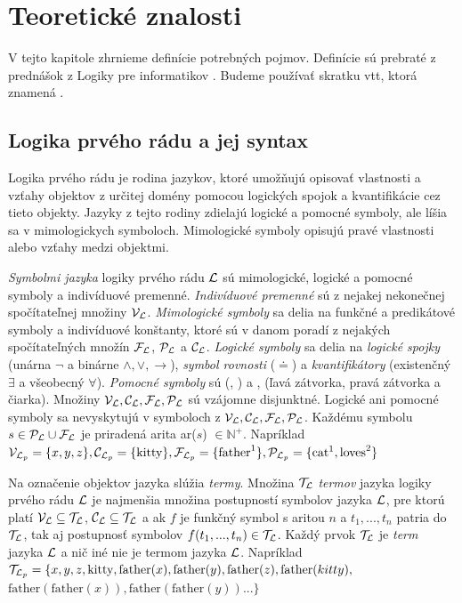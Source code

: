 \chapter{Teoretické znalosti}

V tejto kapitole zhrnieme definície potrebných pojmov. Definície sú prebraté z prednášok z Logiky pre informatikov \cite{logicdefs}. Budeme používať skratku vtt, ktorá znamená .


\section{Logika prvého rádu a jej syntax}

Logika prvého rádu je rodina jazykov, ktoré umožňujú opisovať vlastnosti a vzťahy objektov z určitej domény pomocou logických spojok a kvantifikácie cez tieto objekty. Jazyky z tejto rodiny zdielajú logické a pomocné symboly, ale líšia sa v mimologickych symboloch. Mimologické symboly opisujú pravé vlastnosti alebo vzťahy medzi objektmi.

\emph{Symbolmi jazyka} logiky prvého rádu $\mathcal{L}$ sú mimologické, logické a pomocné symboly a indivíduové premenné.
\emph{Indivíduové premenné} sú z nejakej nekonečnej spočítateľnej množiny $\mathcal{V}_{\mathcal{L}}$.
\emph{Mimologické symboly} sa delia na funkčné a predikátové symboly a indivíduové konštanty, ktoré sú v danom poradí z nejakých spočítateľných množín $\mathcal{F}_{\mathcal{L}}$, $\mathcal{P}_{\mathcal{L}}$ a $\mathcal{C}_{\mathcal{L}}$.
\emph{Logické symboly} sa delia na \emph{logické spojky} (unárna $\neg$ a binárne $\land, \lor, \to$), \emph{symbol rovnosti} ($\doteq$) a \emph{kvantifikátory} (existenčný $\exists$ a všeobecný $\forall$).
\emph{Pomocné symboly} sú (, ) a , (ľavá zátvorka, pravá zátvorka a čiarka).
Množiny $\mathcal{V}_{\mathcal{L}},\mathcal{C}_{\mathcal{L}}, \mathcal{F}_{\mathcal{L}}, \mathcal{P}_{\mathcal{L}}$ sú vzájomne disjunktné. Logické ani pomocné symboly sa nevyskytujú v symboloch z $\mathcal{V}_{\mathcal{L}}, \mathcal{C}_{\mathcal{L}}, \mathcal{F}_{\mathcal{L}}, \mathcal{P}_{\mathcal{L}}$. Každému symbolu $s \in \mathcal{P}_{\mathcal{L}} \cup \mathcal{F}_{\mathcal{L}}$ je priradená arita ar($s$) $\in \mathbb{N}^+$.
Napríklad $\mathcal{V}_{\mathcal{L}_p} = \{x, y, z\}, \mathcal{C}_{\mathcal{L}_p} = \{\text{kitty}\}, \mathcal{F}_{\mathcal{L}_p} = \{\text{father}^1\}, \mathcal{P}_{\mathcal{L}_p} = \{\text{cat}^1, \text{loves}^2\}$

Na označenie objektov jazyka slúžia \emph{termy}. 
Množina $\mathcal{T}_{\mathcal{L}}$ \emph{termov} jazyka logiky prvého rádu $\mathcal{L}$ je najmenšia množina postupností symbolov jazyka $\mathcal{L}$, pre ktorú platí $\mathcal{V}_{\mathcal{L}} \subseteq \mathcal{T}_{\mathcal{L}}$, $\mathcal{C}_{\mathcal{L}} \subseteq \mathcal{T}_{\mathcal{L}}$ a ak $f$ je funkčný symbol s aritou $n$ a $t_1, ..., t_n$ patria do $\mathcal{T}_{\mathcal{L}}$, tak aj postupnosť symbolov $f(t_1, ..., t_n) \in \mathcal{T}_{\mathcal{L}}$. 
Každý prvok $\mathcal{T}_{\mathcal{L}}$ je \emph{term} jazyka $\mathcal{L}$ a nič iné nie je termom jazyka $\mathcal{L}$.
Napríklad $\mathcal{T}_{\mathcal{L}_p} = \{x, y, z, \text{kitty}, \text{father}(x), \text{father}(y), \text{father}(z), \text{father}(kitty),$\\$\text{father}(\text{father}(x)), \text{father}(\text{father}(y)) ... \}$

